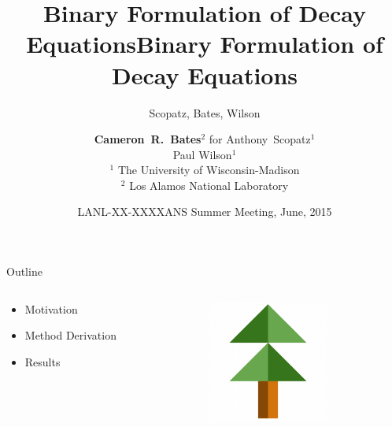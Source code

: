 \documentclass[xcolor=x11names,compress]{beamer}
\title{Binary Formulation of Decay Equations}
\author{Scopatz, Bates, Wilson}
\date{LANL-XX-XXXX}
\begin{document}
\begin{frame}
\title{Binary Formulation of Decay Equations}
\author{\textbf{Cameron~R.~Bates$^{2}$} for Anthony~Scopatz$^{1}$ \\
        \vspace{0.1in}
        Paul Wilson$^{1}$\\
        \vspace{0.1in}
        $^{1}$ The University of Wisconsin-Madison\\
        $^{2}$ Los Alamos National Laboratory}

\date{ANS Summer Meeting, June, 2015}
\titlepage
\end{frame}

\begin{frame}{Outline}
    \Large
	\begin{columns}
  	\begin{column}{0.5\textwidth}
	    \begin{itemize}
        \item Motivation
        \item Method Derivation
        \item Results
	    \end{itemize}
  	\end{column}
 	\begin{column}{0.4\textwidth}
 	   \begin{center}
 	   \begin{figure}
       \includegraphics[height=4cm]{pyne-icon-big.png}
	   \end{figure}
 	   \end{center}
  	\end{column}
	\end{columns}

\end{frame}

\end{document}
